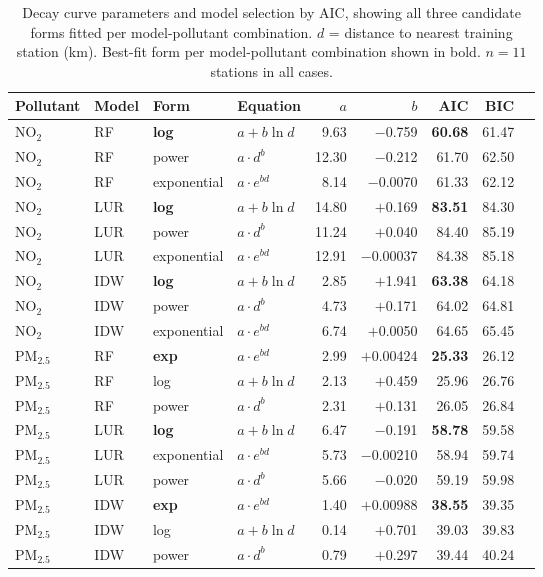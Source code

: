 \documentclass[11pt,a4paper]{article}
\begin{document}
\begin{table}[htbp]
\caption{Decay curve parameters and model selection by AIC, showing all three candidate forms fitted per model-pollutant combination. $d$ = distance to nearest training station (km). Best-fit form per model-pollutant combination shown in bold. $n = 11$ stations in all cases.}
\label{tab:decay-params}
\small
\begin{tabular}{llllrrrrr}
\toprule
\textbf{Pollutant} & \textbf{Model} & \textbf{Form} & \textbf{Equation} & \textbf{$a$} & \textbf{$b$} & \textbf{AIC} & \textbf{BIC} \\
\midrule
NO$_2$    & RF  & \textbf{log} & $a + b\ln d$ & 9.63  & $-$0.759  & \textbf{60.68} & 61.47 \\
NO$_2$    & RF  & power        & $a \cdot d^b$ & 12.30 & $-$0.212  & 61.70 & 62.50 \\
NO$_2$    & RF  & exponential  & $a \cdot e^{bd}$ & 8.14  & $-$0.0070 & 61.33 & 62.12 \\
\midrule
NO$_2$    & LUR & \textbf{log} & $a + b\ln d$ & 14.80 & $+$0.169  & \textbf{83.51} & 84.30 \\
NO$_2$    & LUR & power        & $a \cdot d^b$ & 11.24 & $+$0.040  & 84.40 & 85.19 \\
NO$_2$    & LUR & exponential  & $a \cdot e^{bd}$ & 12.91 & $-$0.00037 & 84.38 & 85.18 \\
\midrule
NO$_2$    & IDW & \textbf{log} & $a + b\ln d$ & 2.85  & $+$1.941  & \textbf{63.38} & 64.18 \\
NO$_2$    & IDW & power        & $a \cdot d^b$ & 4.73  & $+$0.171  & 64.02 & 64.81 \\
NO$_2$    & IDW & exponential  & $a \cdot e^{bd}$ & 6.74  & $+$0.0050 & 64.65 & 65.45 \\
\midrule
PM$_{2.5}$ & RF  & \textbf{exp} & $a \cdot e^{bd}$ & 2.99  & $+$0.00424 & \textbf{25.33} & 26.12 \\
PM$_{2.5}$ & RF  & log          & $a + b\ln d$ & 2.13  & $+$0.459  & 25.96 & 26.76 \\
PM$_{2.5}$ & RF  & power        & $a \cdot d^b$ & 2.31  & $+$0.131  & 26.05 & 26.84 \\
\midrule
PM$_{2.5}$ & LUR & \textbf{log} & $a + b\ln d$ & 6.47  & $-$0.191  & \textbf{58.78} & 59.58 \\
PM$_{2.5}$ & LUR & exponential  & $a \cdot e^{bd}$ & 5.73  & $-$0.00210 & 58.94 & 59.74 \\
PM$_{2.5}$ & LUR & power        & $a \cdot d^b$ & 5.66  & $-$0.020  & 59.19 & 59.98 \\
\midrule
PM$_{2.5}$ & IDW & \textbf{exp} & $a \cdot e^{bd}$ & 1.40  & $+$0.00988 & \textbf{38.55} & 39.35 \\
PM$_{2.5}$ & IDW & log          & $a + b\ln d$ & 0.14  & $+$0.701  & 39.03 & 39.83 \\
PM$_{2.5}$ & IDW & power        & $a \cdot d^b$ & 0.79  & $+$0.297  & 39.44 & 40.24 \\
\bottomrule
\end{tabular}
\end{table}
\end{document}
